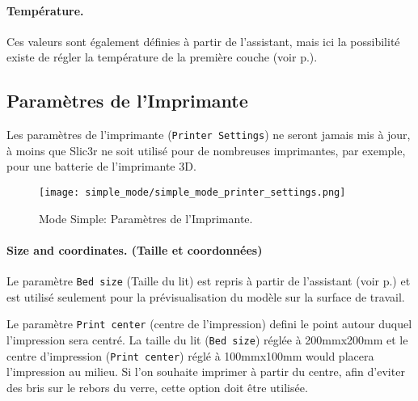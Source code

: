 \paragraph{Temp\'erature.} %
\label{par:temperature}
Ces valeurs sont \'egalement d\'efinies \`a partir de l'assistant, mais ici la possibilit\'e existe de r\'egler la temp\'erature de la premi\`ere couche (voir p.\pageref{sec:the_important_first_layer}).


\subsection{Param\`etres de l'Imprimante}

Les param\`etres de l'imprimante (\texttt{Printer Settings}) ne seront jamais mis \`a jour, \`a moins que Slic3r ne soit utilis\'e pour de nombreuses imprimantes, par exemple, pour une batterie de l'imprimante 3D.

\begin{figure}[H]
\centering
\texttt{[image: simple\_mode/simple\_mode\_printer\_settings.png]}
\caption{Mode Simple: Param\`etres de l'Imprimante.}
\label{fig:simple_mode_printer_settings}
\end{figure}

\paragraph{Size and coordinates. (Taille et coordonn\'ees)} %
\label{par:size_and_coordinates}
Le param\`etre \texttt{Bed size} (Taille du lit) est repris \`a partir de l'assistant (voir p.\pageref{sub:2_bed_size}) et est utilis\'e seulement pour la pr\'evisualisation du mod\`ele sur la surface de travail.

Le param\`etre \texttt{Print center} (centre de l'impression) defini le point autour duquel l'impression sera centr\'e.  La taille du lit (\texttt{Bed size}) r\'egl\'ee \`a 200mmx200mm et le centre d'impression (\texttt{Print center}) r\'egl\'e \`a 100mmx100mm would placera l'impression au milieu.  Si l'on souhaite imprimer \`a partir du centre, afin d'eviter des bris sur le rebors du verre, cette option doit \^etre utilis\'ee.

